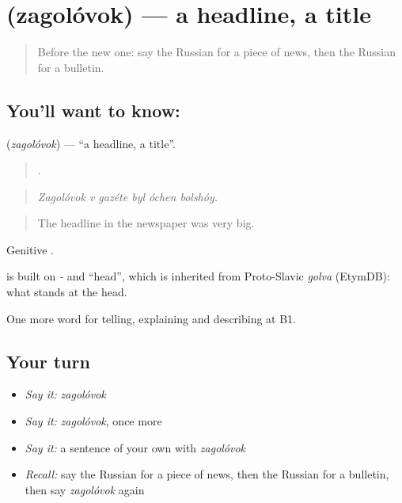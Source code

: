 \section[\texorpdfstring{\ru{заголовок} (zagolóvok)}{заголовок (zagolóvok)}]{ (zagolóvok) — a headline, a title}

\label{lesson:RU-C279-zagolovok}



\begin{quote}
Before the new one: say the Russian for a piece of news, then the Russian for a bulletin.
\end{quote}

\subsection*{You'll want to know: }
\textbf{} (\emph{zagolóvok}) — \textquotedblleft{}a headline, a title\textquotedblright{}.

\begin{quote}
     .
\end{quote}

\begin{quote}
\emph{Zagolóvok v gazéte byl óchen bolshóy.}
\end{quote}

\begin{quote}
The headline in the newspaper was very big.
\end{quote}

Genitive \emph{}.

\begin{cousinweb}
\emph{} is built on \emph{-} and \emph{} \textquotedblleft{}head\textquotedblright{}, which is inherited from Proto-Slavic \emph{golva} (EtymDB): what stands at the head.
\end{cousinweb}

\begin{grammarlens}[title={What you've built}]
One more word for telling, explaining and describing at B1.
\end{grammarlens}

\subsection*{Your turn}
\begin{itemize}
\raggedright
  \item \emph{Say it:} \emph{zagolóvok}
  \item \emph{Say it:} \emph{zagolóvok}, once more
  \item \emph{Say it:} a sentence of your own with \emph{zagolóvok}
  \item \emph{Recall:} say the Russian for a piece of news, then the Russian for a bulletin, then say \emph{zagolóvok} again
\end{itemize}

